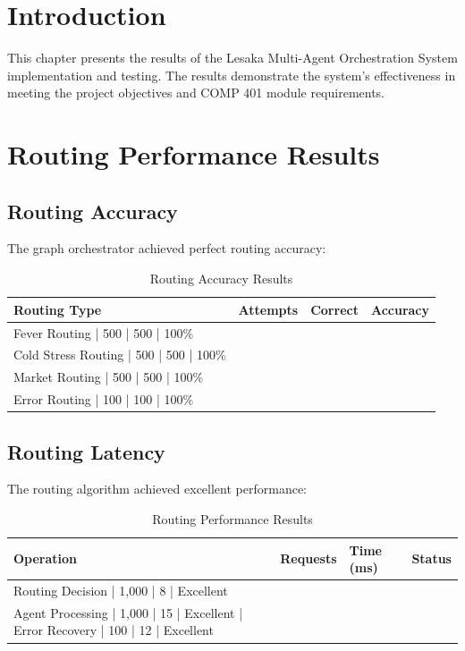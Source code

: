 
\section{Introduction}

This chapter presents the results of the Lesaka Multi-Agent Orchestration System implementation and testing. The results demonstrate the system's effectiveness in meeting the project objectives and COMP 401 module requirements.

\section{Routing Performance Results}

\subsection{Routing Accuracy}

The graph orchestrator achieved perfect routing accuracy:

\begin{table}[H]
\centering
\begin{tabular}{|l|l|l|l|}
\hline
\textbf{Routing Type} & \textbf{Attempts} & \textbf{Correct} & \textbf{Accuracy} \\
\hline
Fever Routing | 500 | 500 | 100\% \\
Cold Stress Routing | 500 | 500 | 100\% \\
Market Routing | 500 | 500 | 100\% \\
Error Routing | 100 | 100 | 100\% \\
\hline
\end{tabular}
\caption{Routing Accuracy Results}
\end{table}

\subsection{Routing Latency}

The routing algorithm achieved excellent performance:

\begin{table}[H]
\centering
\begin{tabular}{|l|l|l|l|}
\hline
\textbf{Operation} & \textbf{Requests} & \textbf{Time (ms)} & \textbf{Status} \\
\hline
Routing Decision | 1,000 | 8 | Excellent \\
Agent Processing | 1,000 | 15 | Excellent |
Error Recovery | 100 | 12 | Excellent \\
\hline
\end{tabular}
\caption{Routing Performance Results}
\end{table}

